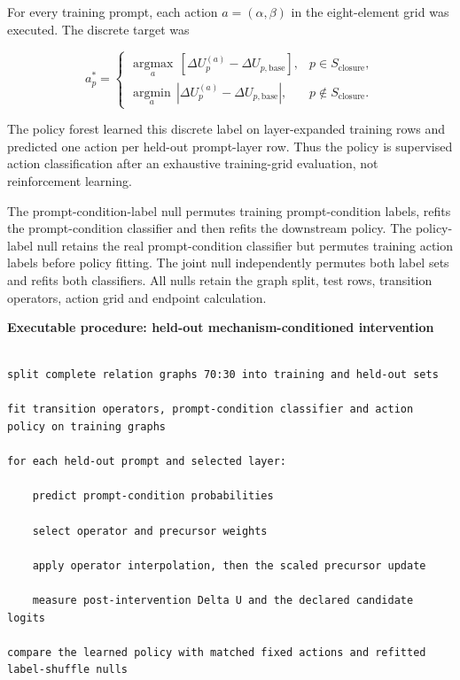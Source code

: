 \documentclass[10pt]{article}
\begin{document}
For every training prompt, each action \(a=(\alpha,\beta)\) in the eight-element grid was executed. The discrete target was

\begin{equation*}
a_p^*=\begin{cases}
\operatorname*{argmax}_{a}\,[\Delta U_p^{(a)}-\Delta U_{p,\mathrm{base}}], & p\in S_{\mathrm{closure}},\\
\operatorname*{argmin}_{a}\,|\Delta U_p^{(a)}-\Delta U_{p,\mathrm{base}}|, & p\notin S_{\mathrm{closure}}.
\end{cases}
\end{equation*}

The policy forest learned this discrete label on layer-expanded training rows and predicted one action per held-out prompt-layer row. Thus the policy is supervised action classification after an exhaustive training-grid evaluation, not reinforcement learning.

The prompt-condition-label null permutes training prompt-condition labels, refits the prompt-condition classifier and then refits the downstream policy. The policy-label null retains the real prompt-condition classifier but permutes training action labels before policy fitting. The joint null independently permutes both label sets and refits both classifiers. All nulls retain the graph split, test rows, transition operators, action grid and endpoint calculation.

\textbf{Executable procedure: held-out mechanism-conditioned intervention}

\begin{Verbatim}[fontsize=\small,breaklines=true,breakanywhere=true]

split complete relation graphs 70:30 into training and held-out sets

fit transition operators, prompt-condition classifier and action policy on training graphs

for each held-out prompt and selected layer:

    predict prompt-condition probabilities

    select operator and precursor weights

    apply operator interpolation, then the scaled precursor update

    measure post-intervention Delta U and the declared candidate logits

compare the learned policy with matched fixed actions and refitted label-shuffle nulls

\end{Verbatim}
\end{document}
